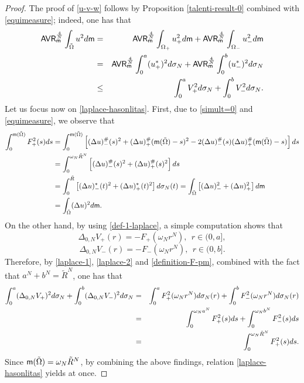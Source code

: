 \documentclass[11pt, reqno]{amsart}
\numberwithin{equation}{section}
\begin{document}
		\begin{proof}
			The proof of 	\eqref{u-v-w} follows by Proposition \ref{talenti-result-0} combined with \eqref{equimeasure}; indeed, one has that 
			\begin{eqnarray*}
				{\sf AVR}_ {\sf m}^\frac{4}{N}	\int_{\tilde \Omega}u^2 {\rm d}{\sf m}&=&{\sf AVR}_ {\sf m}^\frac{4}{N}	\int_{\Omega_+}u_+^2 {\rm d}{\sf m}+{\sf AVR}_ {\sf m}^\frac{4}{N}	\int_{ \Omega_-}u_-^2 {\rm d}{\sf m}\\&=&{\sf AVR}_ {\sf m}^\frac{4}{N}	\int_{0}^a (u_+^*)^2 {\rm d}\sigma_N+{\sf AVR}_ {\sf m}^\frac{4}{N}	\int_{ 0}^b(u_-^*)^2 {\rm d}\sigma_N\\&\leq&\int_{0}^aV_+^2 {\rm d}\sigma_N+\int_{0}^b V_-^2 {\rm d}\sigma_N.
			\end{eqnarray*}
			Let us focus now on \eqref{laplace-hasonlitas}. First, due to \eqref{simult=0} and \eqref{equimeasure}, we observe that
			\begin{align*}
				\int_{0}^{{\sf m}(\tilde \Omega)} F^2_+(s){\rm d}s
				&=\int_{0}^{{\sf m}(\tilde \Omega)} \left[(\Delta u)^\#_-(s)^2+(\Delta u)^\#_+({\sf m}(\tilde \Omega)-s)^2-2(\Delta u)^\#_-(s)(\Delta u)^\#_+({\sf m}(\tilde \Omega)-s)\right]{\rm d}s
				\\
				&=\int_{0}^{\omega_N \tilde R^N} \left[(\Delta u)^\#_-(s)^2+(\Delta u)^\#_+(s)^2\right]{\rm d}s\\&=\int_{0}^{\tilde R} \left[(\Delta u)^*_-(t)^2+(\Delta u)^*_+(t)^2\right]{\rm d}\sigma_N(t)	=\int_{\tilde \Omega} \left[(\Delta u)_-^2+(\Delta u)^2_+\right]{\rm d}{\sf m}
				\\&=\int_{\tilde \Omega} (\Delta u)^2{\rm d}{\sf m}.
			\end{align*}
			On the other hand, by using \eqref{def-1-laplace}, 
			a simple computation shows that
			\begin{equation}\label{laplace-1}
				\Delta_{0,N} V_+(r)=-F_+(\omega_N r^N),\ \ r\in (0,a],
			\end{equation}
			\begin{equation}\label{laplace-2}
				\Delta_{0,N} V_-(r)=-F_-(\omega_N r^N),\ \ r\in (0,b].
			\end{equation}
			Therefore, by \eqref{laplace-1},  \eqref{laplace-2} and  \eqref{definition-F-pm}, combined with the fact that $a^N+b^N=\tilde R^N$, one has that
			\begin{eqnarray*}
				\int_{0}^a (\Delta_{0,N}V_+)^2{\rm d}\sigma_N+ \int_{0}^b (\Delta_{0,N}V_-)^2{\rm d}\sigma_N&=&\int_{0}^a F_+^2(\omega_N r^N){\rm d}\sigma_N(r)+ \int_{0}^b F^2_-(\omega_N r^N){\rm d}\sigma_N(r)\\&=& \int_{0}^{\omega_N a^N} F_+^2(s){\rm d}s+ \int_{0}^{\omega_N b^N} F_-^2(s){\rm d}s\\&=&\int_{0}^{\omega_N \tilde R^N} F_+^2(s){\rm d}s.
			\end{eqnarray*}
			Since ${\sf m}(\tilde \Omega)=\omega_N \tilde R^N$, by combining the above findings, relation  \eqref{laplace-hasonlitas} yields at once. 
		\end{proof}
		
\end{document}
